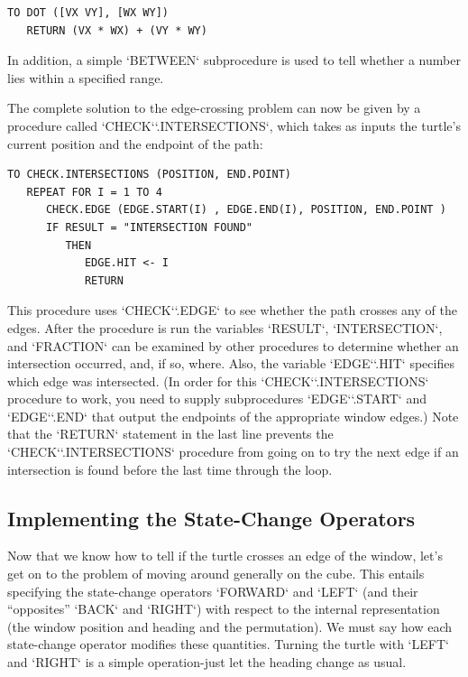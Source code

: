 \documentclass{book}
\begin{document}
\begin{verbatim}
TO DOT ([VX VY], [WX WY])
   RETURN (VX * WX) + (VY * WY)
\end{verbatim}
In addition, a simple \textsc{`BETWEEN`} subprocedure is used to tell whether a
number lies within a specified range.

The complete solution to the edge-crossing problem can now be given
by a procedure called \textsc{`CHECK`}\textsc{`.INTERSECTIONS`}, which takes as inputs the
turtle's current position and the endpoint of the path:

\begin{verbatim}
TO CHECK.INTERSECTIONS (POSITION, END.POINT)
   REPEAT FOR I = 1 TO 4
      CHECK.EDGE (EDGE.START(I) , EDGE.END(I), POSITION, END.POINT )
      IF RESULT = "INTERSECTION FOUND"
         THEN
            EDGE.HIT <- I
            RETURN
\end{verbatim}
This procedure uses \textsc{`CHECK`}\textsc{`.EDGE`} to see whether the path crosses any of
the edges. After the procedure is run the variables \textsc{`RESULT`}, \textsc{`INTERSECTION`},
and \textsc{`FRACTION`} can be examined by other procedures to determine whether
an intersection occurred, and, if so, where. Also, the variable \textsc{`EDGE`}\textsc{`.HIT`}
specifies which edge was intersected. (In order for this \textsc{`CHECK`}\textsc{`.INTERSECTIONS`} procedure to work, you need to supply subprocedures \textsc{`EDGE`}\textsc{`.START`}
and \textsc{`EDGE`}\textsc{`.END`} that output the endpoints of the appropriate window
edges.)
Note that the \textsc{`RETURN`} statement in the last line prevents the \textsc{`CHECK`}\textsc{`.INTERSECTIONS`} procedure from going on to try the next edge if an intersection is found before the last time through the loop.

\subsection{Implementing the State-Change Operators}

Now that we know how to tell if the turtle crosses an edge of the window,
let's get on to the problem of moving around generally on the cube.
This entails specifying the state-change operators \textsc{`FORWARD`} and \textsc{`LEFT`}
(and their ``opposites'' \textsc{`BACK`} and \textsc{`RIGHT`}) with respect to the internal
representation (the window position and heading and the permutation).
We must say how each state-change operator modifies these quantities.
Turning the turtle with \textsc{`LEFT`} and \textsc{`RIGHT`} is a simple operation-just let
the heading change as usual.
\end{document}
